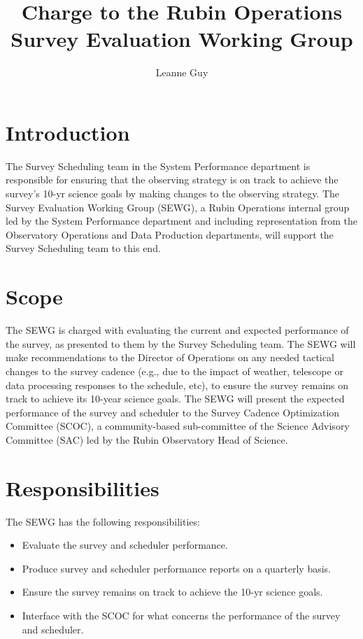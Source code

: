 \documentclass[OPS,authoryear,toc]{lsstdoc}
\title{Charge to the Rubin Operations Survey Evaluation Working Group}
\author{%
Leanne Guy
}
\date{\vcsDate}
\begin{document}
\maketitle


\section{Introduction}
The Survey Scheduling team in the System Performance department is responsible for ensuring that the observing strategy is on track to achieve the survey's 10-yr science goals by making changes to the observing strategy. 
The Survey Evaluation Working Group (SEWG), a Rubin Operations internal group led by the System Performance department and including representation from the Observatory Operations and Data Production departments, will  support the Survey Scheduling team to this end. 

\section{Scope}
The SEWG is charged with evaluating the current and expected performance of the survey, as presented to them by the Survey Scheduling team. 
The SEWG will make recommendations to the Director of Operations on any needed tactical changes to the survey cadence (e.g., due to the impact of weather, telescope or data processing responses to the schedule, etc),  to ensure the survey remains on track to achieve its 10-year science goals. 
The SEWG will present the expected performance of the survey and scheduler to the Survey Cadence Optimization Committee (SCOC), a community-based sub-committee of the Science Advisory Committee (SAC) led  by the Rubin Observatory Head of Science. 

\section{Responsibilities}
The SEWG has the following responsibilities: 
\begin{itemize}
\item Evaluate the survey and scheduler performance.
\item Produce survey and scheduler performance reports on a quarterly basis.
\item Ensure the survey remains on track to achieve the 10-yr science goals. 
\item Interface with the SCOC for what concerns the performance of the survey and scheduler.
\end{itemize}
\end{document}
